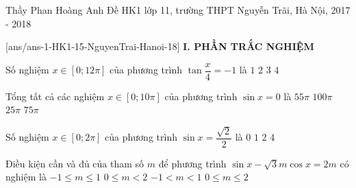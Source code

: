 	\begin{name}
		{Thầy Phan Hoàng Anh}
		{Đề HK1 lớp 11, trường THPT Nguyễn Trãi, Hà Nội, 2017 - 2018}
	\end{name}
	\setcounter{ex}{0}\setcounter{bt}{0}
	[ans/ans-1-HK1-15-NguyenTrai-Hanoi-18]
\noindent\textbf{I. PHẦN TRẮC NGHIỆM}
\begin{ex}%
Số nghiệm $x\in[0;12\pi]$ của phương trình $\tan\dfrac{x}{4}=-1$ là
	\choice
	{$ 1 $}
	{$ 2 $}
	{\True $ 3 $}
	{$ 4 $}
\end{ex}
\begin{ex}%
Tổng tất cả các nghiệm $x\in[0;10\pi]$ của phương trình $\sin x=0$ là
	\choice
	{\True $ 55\pi $}
	{$ 100\pi $}
	{$ 25\pi $}
	{$ 75\pi $}
\end{ex}
\begin{ex}%
Số nghiệm $x\in[0;2\pi]$ của phương trình $\sin x=\dfrac{\sqrt{2}}{2}$ là 
	\choice
	{$ 0 $}
	{$ 1 $}
	{\True $ 2 $}
	{$ 4 $}
\end{ex}
\begin{ex}%
Điều kiện cần và đủ của tham số $ m $ để phương trình $\sin x-\sqrt{3}m\cos x=2m$ có nghiệm là
	\choice
	{\True $ -1\le m\le1 $}
	{$ 0\le m<2 $}
	{$ -1<m<1 $}
	{$0\le m \le2$}
\end{ex}

